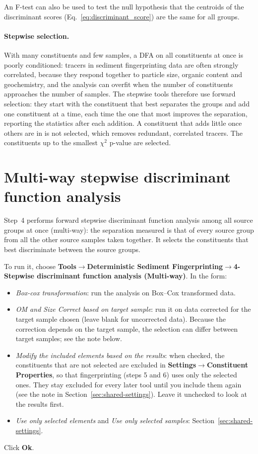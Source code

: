 \documentclass[12pt]{report}
\begin{document}
An F-test can also be used to test the null hypothesis that the centroids of the discriminant scores (Eq.~\ref{eq:discriminant_score}) are the same for all groups.

\paragraph{Stepwise selection.} With many constituents and few samples, a DFA on all constituents at once is poorly conditioned: tracers in sediment fingerprinting data are often strongly correlated, because they respond together to particle size, organic content and geochemistry, and the analysis can overfit when the number of constituents approaches the number of samples. The stepwise tools therefore use forward selection: they start with the constituent that best separates the groups and add one constituent at a time, each time the one that most improves the separation, reporting the statistics after each addition. A constituent that adds little once others are in is not selected, which removes redundant, correlated tracers. The constituents up to the smallest $\chi^2$ p-value are selected.

\section{Multi-way stepwise discriminant function analysis}\label{sec:multiway-dfa}

Step~4 performs forward stepwise discriminant function analysis among all source groups at once (multi-way): the separation measured is that of every source group from all the other source samples taken together. It selects the constituents that best discriminate between the source groups.

To run it, choose \textbf{Tools}$\rightarrow$\textbf{Deterministic Sediment Fingerprinting}$\rightarrow$\textbf{4-Stepwise discriminant function analysis (Multi-way)}. In the form:
\begin{itemize}
    \item \textit{Box-cox transformation}: run the analysis on Box--Cox transformed data.
    \item \textit{OM and Size Correct based on target sample}: run it on data corrected for the target sample chosen (leave blank for uncorrected data). Because the correction depends on the target sample, the selection can differ between target samples; see the note below.
    \item \textit{Modify the included elements based on the results}: when checked, the constituents that are not selected are excluded in \textbf{Settings}$\rightarrow$\textbf{Constituent Properties}, so that fingerprinting (steps 5 and 6) uses only the selected ones. They stay excluded for every later tool until you include them again (see the note in Section~\ref{sec:shared-settings}). Leave it unchecked to look at the results first.
    \item \textit{Use only selected elements} and \textit{Use only selected samples}: Section~\ref{sec:shared-settings}.
\end{itemize}
Click \textbf{Ok}.
\end{document}

